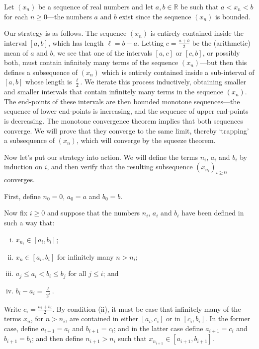 \begin{cproof}
Let $(x_n)$ be a sequence of real numbers and let $a,b \in \mathbb{R}$ be such that $a < x_n < b$ for each $n \ge 0$---the numbers $a$ and $b$ exist since the sequence $(x_n)$ is bounded.

Our strategy is as follows. The sequence $(x_n)$ is entirely contained inside the interval $[a, b]$, which has length $\ell = b-a$. Letting $c = \frac{a+b}{2}$ be the (arithmetic) mean of $a$ and $b$, we see that one of the intervals $[a,c]$ or $[c,b]$, or possibly both, must contain infinitely many terms of the sequence $(x_n)$---but then this defines a subsequence of $(x_n)$ which is entirely contained inside a sub-interval of $[a,b]$ whose length is $\frac{\ell}{2}$. We iterate this process inductively, obtaining smaller and smaller intervals that contain infinitely many terms in the sequence $(x_n)$. The end-points of these intervals are then bounded monotone sequences---the sequence of lower end-points is increasing, and the sequence of upper end-points is decreasing. The monotone convergence theorem implies that both sequences converge. We will prove that they converge to the same limit, thereby `trapping' a subsequence of $(x_n)$, which will converge by the squeeze theorem.

Now let's put our strategy into action. We will define the terms $n_i$, $a_i$ and $b_i$ by induction on $i$, and then verify that the resulting subsequence $(x_{n_i})_{i \ge 0}$ converges.

First, define $n_0=0$, $a_0=a$ and $b_0=b$.

Now fix $i \ge 0$ and suppose that the numbers $n_i$, $a_i$ and $b_i$ have been defined in such a way that:
\begin{enumerate}[(i)]
\item $x_{n_i} \in [a_i, b_i]$;
\item $x_n \in [a_i, b_i]$ for infinitely many $n > n_i$;
\item $a_j \le a_i < b_i \le b_j$ for all $j \le i$; and
\item $b_i-a_i = \frac{\ell}{2^i}$.
\end{enumerate}
Write $c_i = \frac{a_i+b_i}{2}$. By condition (ii), it must be case that infinitely many of the terms $x_n$, for $n > n_i$, are contained in either $[a_i, c_i]$ or in $[c_i, b_i]$. In the former case, define $a_{i+1}=a_i$ and $b_{i+1}=c_i$; and in the latter case define $a_{i+1}=c_i$ and $b_{i+1}=b_i$; and then define $n_{i+1} > n_i$ such that $x_{n_{i+1}} \in [a_{i+1}, b_{i+1}]$.


\end{cproof}
